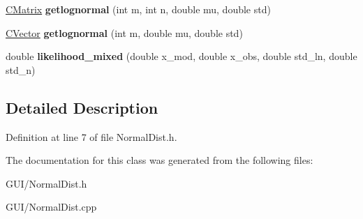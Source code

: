 \begin{DoxyCompactItemize}
\item 
\mbox{\label{class_c_normal_dist_ae751fb9c741772cbb3b300e349383dd5}} 
\hyperlink{class_c_matrix}{C\+Matrix} {\bfseries getlognormal} (int m, int n, double mu, double std)
\item 
\mbox{\label{class_c_normal_dist_abc8ae14e97f57824cc47f103239968ae}} 
\hyperlink{class_c_vector}{C\+Vector} {\bfseries getlognormal} (int m, double mu, double std)
\item 
\mbox{\label{class_c_normal_dist_a32cc160b1b5d71044a148e1da0218ba5}} 
double {\bfseries likelihood\+\_\+mixed} (double x\+\_\+mod, double x\+\_\+obs, double std\+\_\+ln, double std\+\_\+n)
\end{DoxyCompactItemize}


\subsection{Detailed Description}


Definition at line 7 of file Normal\+Dist.\+h.



The documentation for this class was generated from the following files\+:\begin{DoxyCompactItemize}
\item 
G\+U\+I/Normal\+Dist.\+h\item 
G\+U\+I/Normal\+Dist.\+cpp\end{DoxyCompactItemize}
